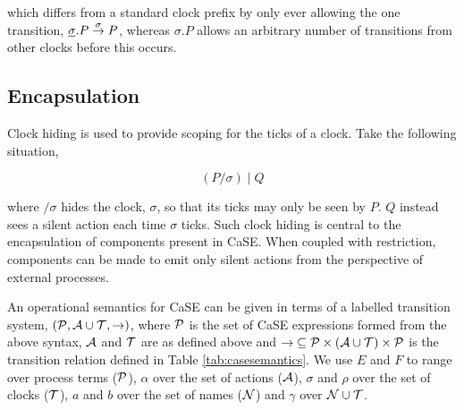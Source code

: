 \noindent which differs from a standard clock prefix by only ever
allowing the one transition, $\underline{\sigma}.P \stackrel{\sigma}{\rightarrow}
P$, whereas $\sigma.P$ allows an arbitrary number of transitions from
other clocks before this occurs.

\subsection{Encapsulation}

Clock hiding is used to provide scoping for the ticks of a
clock.  Take the following situation,

\begin{equation}
\label{clockhidingex}
  (P / \sigma)\;|\;Q
\end{equation}

\noindent where $/ \sigma$ hides the clock, $\sigma$, so that its
ticks may only be seen by $P$.  $Q$ instead sees a silent action each
time $\sigma$ ticks.  Such clock hiding is central to the
encapsulation of components present in CaSE.  When coupled with
restriction, components can be made to emit only silent actions from
the perspective of external processes.

An operational semantics for CaSE can be given in terms of a labelled
transition system, $(\text{$\mathcal{P}$}, \text{$\mathcal{A}$} \cup \text{$\mathcal{T}$}, \rightarrow)$,
where $\text{$\mathcal{P}$}$ is the set of CaSE expressions formed from the above
syntax, $\text{$\mathcal{A}$}$ and $\text{$\mathcal{T}$}$ are as defined above and
$\mathop{\rightarrow} \mathrel{\subseteq} \text{$\mathcal{P}$} \times (\text{$\mathcal{A}$} \cup
\text{$\mathcal{T}$}) \times \text{$\mathcal{P}$}$ is the transition relation defined in Table
\ref{tab:casesemantics}.  We use $E$ and $F$ to range over process
terms ($\text{$\mathcal{P}$}$), $\alpha$ over the set of actions ($\text{$\mathcal{A}$}$),
$\sigma$ and $\rho$ over the set of clocks ($\text{$\mathcal{T}$}$), $a$ and $b$
over the set of names ($\text{$\mathcal{N}$}$) and $\gamma$ over $\text{$\mathcal{N}$} \cup
\text{$\mathcal{T}$}$.

